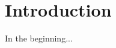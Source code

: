 \documentclass[11pt, a4paper, oneside]{book}
\begin{document}

\frontmatter

\tableofcontents
\mainmatter

\chapter{Introduction}

In the beginning\cite{Test}...


\end{document}
